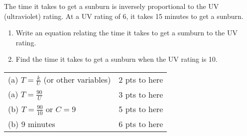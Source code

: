{
	The time it takes to get a sunburn is inversely proportional to the UV (ultraviolet) rating. At a UV rating of 6, it takes 15 minutes to get a sunburn.
	\begin{enumerate}
	\item Write an equation relating the time it takes to get a sumburn to the UV rating.
	\item Find the time it takes to get a sunburn when the UV rating is 10.
	\end{enumerate}
}
{
	\begin{tabular}{l r}
	(a) $T = \frac{k}{U}$ (or other variables) & 2 pts to here\\
	(a) $T = \frac{90}{U}$ & 3 pts to here\\
	(b) $T = \frac{90}{10}$ or $C=9$ & 5 pts to here\\
	(b) $9$ minutes & 6 pts to here
	\end{tabular}
}
